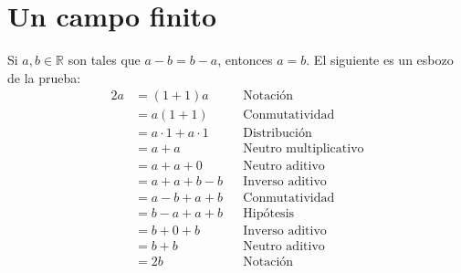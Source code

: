 \documentclass[11pt]{article}
\newcommand{\R}{\mathbb{R}}
\begin{document}
\pagebreak

\section*{Un campo finito}

Si $a,b\in \R$ son tales que $a-b=b-a$, entonces $a=b$. El siguiente es un esbozo de la prueba:
\vspace{1em}\begin{align*}
    2a &= (1+1)a && \text{Notación}\\
    &= a(1+1) && \text{Conmutatividad}\\
    &= a\cdot 1 + a\cdot 1 && \text{Distribución}\\
    &= a + a && \text{Neutro multiplicativo}\\
    &= a +a + 0&& \text{Neutro aditivo}\\
    &= a+a+b-b && \text{Inverso aditivo}\\
    &= a-b+a+b && \text{Conmutatividad}\\
    &= b-a +a +b && \text{Hipótesis}\\
    &= b+0 + b && \text{Inverso aditivo}\\
    &= b+b && \text{Neutro aditivo}\\
    &= 2b && \text{Notación}
\end{align*}
\end{document}
